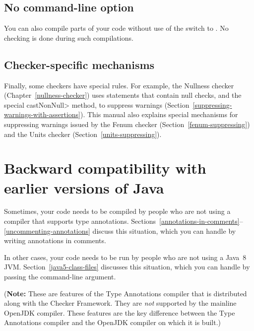 \subsection{No  command-line option\label{no-processor}}

You can also compile parts of your code without use of the
 switch to .  No checking is done during
such compilations.

\subsection{Checker-specific mechanisms\label{checker-specific-suppression}}

Finally, some checkers have special rules.  For example, the Nullness
checker (Chapter~\ref{nullness-checker}) uses  statements that contain
null checks, and the special \<castNonNull> method, to suppress warnings
(Section~\ref{suppressing-warnings-with-assertions}).
This manual also explains special mechanisms for
suppressing warnings issued by the Fenum checker
(Section~\ref{fenum-suppressing}) and the Units checker
(Section~\ref{units-suppressing}).


\section{Backward compatibility with earlier versions of Java\label{backward-compatibility}}

Sometimes, your code needs to be compiled by people who are not using a
compiler that supports type annotations.
Sections~\ref{annotations-in-comments}--\ref{uncommenting-annotations}
discuss this situation, which you can handle by writing annotations in
comments.

In other cases, your code needs to be run by people who are not using a Java~8
JVM\@.  Section~\ref{java5-class-files} discusses this situation, which
you can handle by passing the  command-line argument.

(\textbf{Note:} These are features of the Type Annotations compiler that is
distributed along with the Checker Framework.  They are \emph{not}
supported by the mainline OpenJDK compiler.  These features are the key
difference between the Type Annotations compiler and the OpenJDK compiler
on which it is built.)



